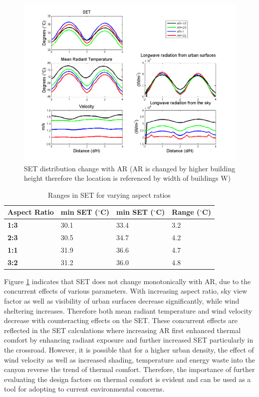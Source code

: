 \documentclass[smallextended]{svjour3}
\begin{document}
\begin{figure}[!h]
\graphicspath{ {image/} }
\centerline{\includegraphics[width=\textwidth]{aspectratio_variables.png}}
\caption{SET distribution change with AR (AR is changed by higher building height therefore the location is referenced by width of buildings W)}
\label{Fig.AR}
\end{figure}

\begin{table}[!h]
\centering
\caption{Ranges in SET for varying aspect ratios}
\label{table:AR_range}
\begin{tabular}{llll}
  Aspect Ratio  & \textbf{min SET ($^{\circ}$C)} & \textbf{min SET ($^{\circ}$C)} & \textbf{Range ($^{\circ}$C)}\\ \hline
\multicolumn{1}{l|}{\textbf{1:3}} &     30.1     &     33.4      &   3.2        \\
\multicolumn{1}{l|}{\textbf{2:3}} &      30.5     &     34.7      &  4.2         \\
\multicolumn{1}{l|}{\textbf{1:1}} &      31.9     &     36.6      &   4.7       \\
\multicolumn{1}{l|}{\textbf{3:2}} &      31.2     &      36.0     &  4.8        
\end{tabular}
\end{table}

Figure \ref{Fig.AR} indicates that SET does not change monotonically with AR, due to the concurrent effects of various parameters. With increasing aspect ratio, sky view factor as well as visibility of urban surfaces decrease significantly, while wind sheltering increases. Therefore both mean radiant temperature and wind velocity decrease with counteracting effects on the SET. These concurrent effects are reflected in the SET calculations where increasing AR first enhanced thermal comfort by enhancing radiant exposure and further increased SET particularly in the crossroad.  However, it is possible that for a higher urban density, the effect of wind velocity as well as increased shading, temperature and energy waste into the canyon reverse the trend of thermal comfort. Therefore, the importance of further evaluating the design factors on thermal comfort is evident and can be used as a tool for adopting to current environmental concerns. 
\end{document}
